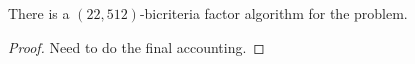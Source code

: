 \begin{theorem}
	There is a $\left(22,512\right)$-bicriteria factor algorithm for the \mckc problem.
\end{theorem}
\begin{proof}

Need to do the final accounting. 
\end{proof}
